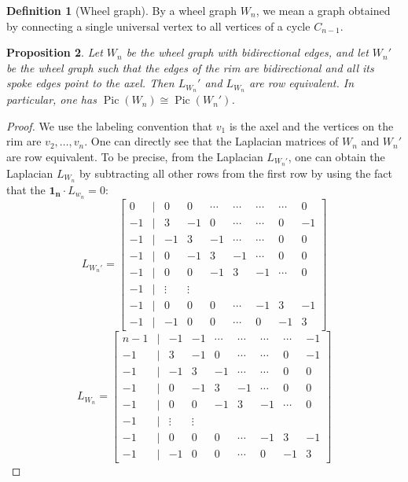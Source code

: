 \documentclass[11pt,reqno]{amsart}
\DeclareMathOperator{\Pic}{Pic}
\theoremstyle{definition}
\newtheorem{mydef}{Definition}[section]
\theoremstyle{plain}
\newtheorem{proposition}[mydef]{Proposition}
\begin{document}
\begin{mydef}[{Wheel graph}]
By a wheel graph $W_n$, we mean a graph obtained by connecting a single universal vertex to all vertices of a cycle $C_{n-1}$. 
\end{mydef}

\begin{proposition}
Let $W_n$ be the wheel graph with bidirectional edges, and let $W_n'$ be the wheel graph such that the edges of the rim are bidirectional and all its spoke edges point to the axel. 
Then $L_{W_n}'$ and $L_{W_n}$ are row equivalent. In particular, one has $\Pic (W_n) \cong \Pic (W_n')$.
\end{proposition}

\begin{proof}
We use the labeling convention that $v_1$ is the axel and the vertices on the rim are $v_2, \dots, v_{n}$. One can directly see that the Laplacian matrices of $W_n$ and $W_n'$ are row equivalent. To be precise, from the Laplacian $L_{W_n'}$, one can obtain the Laplacian $L_{W_n}$ by subtracting all other rows from the first row by using the fact that the $\mathbf{1_n} \cdot L_{w_n} = 0$:
\[
	L_{W_n'} = \begin{bmatrix}
		0 & | & 0 & 0 & \cdots & \cdots & \cdots & \cdots & 0 \\
		\hline
		-1 & | & 3 & -1 & 0 & \cdots & \cdots & 0 & -1 \\
		-1 & | & - 1& 3 & -1 & \cdots & \cdots & 0 & 0 \\
		-1 & | & 0 & - 1& 3 & -1 & \cdots & 0 & 0 \\
		-1 & | & 0 & 0 & - 1& 3 & -1 & \cdots & 0 \\
		-1 & | & \vdots & \vdots \\
		-1 & | & 0 & 0 & 0 & \cdots & -1& 3 & -1 \\
		-1 & | & -1 & 0 & 0 & \cdots& 0 & -1 & 3 
	\end{bmatrix}
\]
\[
L_{W_n} = \begin{bmatrix}
		n-1 & | & -1 & -1 & \cdots & \cdots & \cdots & \cdots & -1 \\
		\hline
		-1 & | & 3 & -1 & 0 & \cdots & \cdots & 0 & -1 \\
		-1 & | & - 1& 3 & -1 & \cdots & \cdots & 0 & 0 \\
		-1 & | & 0 & - 1& 3 & -1 & \cdots & 0 & 0 \\
		-1 & | & 0 & 0 & - 1& 3 & -1 & \cdots & 0 \\
		-1 & | & \vdots & \vdots \\
		-1 & | & 0 & 0 & 0 & \cdots & -1& 3 & -1 \\
		-1 & | & -1 & 0 & 0 & \cdots& 0 & -1 & 3 
	\end{bmatrix}
\]

\end{proof}
\end{document}
